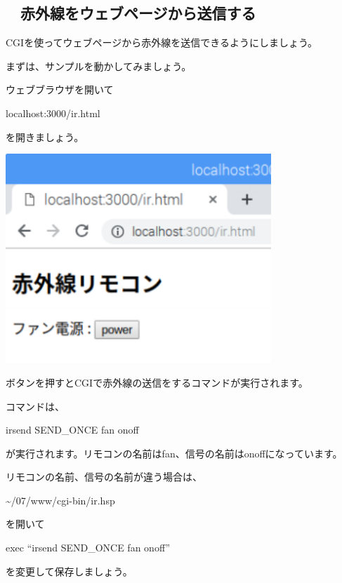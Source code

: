 
\clearpage\subsection*{\theExercise　赤外線をウェブページから送信する}
\addtocounter{Exercise}{-1}\label{E:IR}

CGIを使ってウェブページから赤外線を送信できるようにしましょう。

まずは、サンプルを動かしてみましょう。

ウェブブラウザを開いて

localhost:3000/ir.html

を開きましょう。

%
%


\centering
\includegraphics[width=10cm]{text07-img/ome7-img061.png}
\flushleft

ボタンを押すとCGIで赤外線の送信をするコマンドが実行されます。

コマンドは、

irsend SEND\_ONCE fan onoff

が実行されます。リモコンの名前はfan、信号の名前はonoffになっています。

リモコンの名前、信号の名前が違う場合は、

{\textasciitilde}/07/www/cgi-bin/ir.hsp

を開いて

exec “irsend SEND\_ONCE fan onoff”

を変更して保存しましょう。

